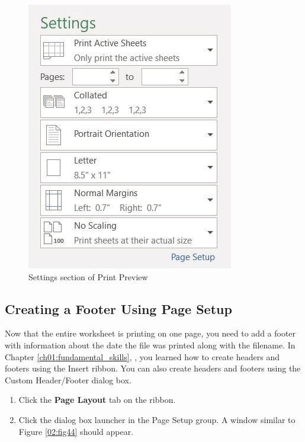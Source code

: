 \begin{figure}[H]
	\centering
	\includegraphics[width=\maxwidth{.95\linewidth}]{gfx/ch02_fig43}
	\caption{Settings section of Print Preview}
	\label{02:fig43}
\end{figure}

\subsection{Creating a Footer Using Page Setup}

Now that the entire worksheet is printing on one page, you need to add a footer with information about the date the file was printed along with the filename. In Chapter \ref{ch01:fundamental_skills}, , you learned how to create headers and footers using the Insert ribbon. You can also create headers and footers using the Custom Header/Footer dialog box.

\begin{enumerate}
	\item Click the \textbf{Page Layout} tab on the ribbon.
	\item Click the dialog box launcher in the Page Setup group. A window similar to Figure \ref{02:fig44} should appear.
\end{enumerate}

